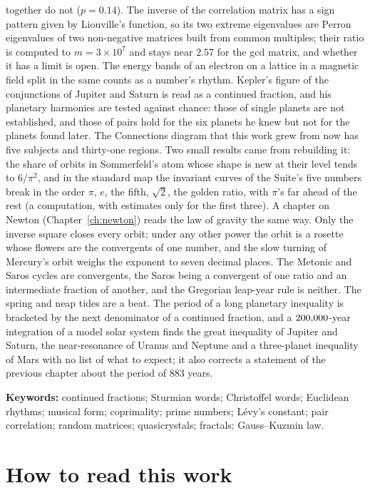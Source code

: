 together do not ($p = 0.14$). The inverse of the correlation matrix has a sign pattern given by Liouville's function, so its two extreme eigenvalues are Perron eigenvalues of two non-negative matrices built from common multiples; their ratio is computed to $m = 3\times10^7$ and stays near $2.57$ for the gcd matrix, and whether it has a limit is open. The energy bands of an electron on a lattice in a magnetic field split in the same counts as a number's rhythm. Kepler's figure of the conjunctions of Jupiter and Saturn is read as a continued fraction, and his planetary harmonies are tested against chance: those of single planets are not established, and those of pairs hold for the six planets he knew but not for the planets found later. \addedon{\revD} The Connections diagram that this work grew from now has five subjects and thirty-one regions. Two small results came from rebuilding it: the share of orbits in Sommerfeld's atom whose shape is new at their level tends to $6/\pi^2$, and in the standard map the invariant curves of the Suite's five numbers break in the order $\pi$, $e$, the fifth, $\sqrt2$, the golden ratio, with $\pi$'s far ahead of the rest (a computation, with estimates only for the first three). \addedon{\revE} A chapter on Newton (Chapter~\ref{ch:newton}) reads the law of gravity the same way. Only the inverse square closes every orbit; under any other power the orbit is a rosette whose flowers are the convergents of one number, and the slow turning of Mercury's orbit weighs the exponent to seven decimal places. The Metonic and Saros cycles are convergents, the Saros being a convergent of one ratio and an intermediate fraction of another, and the Gregorian leap-year rule is neither. The spring and neap tides are a beat. The period of a long planetary inequality is bracketed by the next denominator of a continued fraction, and a $200{,}000$-year integration of a model solar system finds the great inequality of Jupiter and Saturn, the near-resonance of Uranus and Neptune and a three-planet inequality of Mars with no list of what to expect; it also corrects a statement of the previous chapter about the period of $883$ years. \addedon{\revF}

\vspace{1em}
\noindent\textbf{Keywords:} continued fractions; Sturmian words; Christoffel words; Euclidean rhythms; musical form; coprimality; prime numbers; Lévy's constant; pair correlation; random matrices; quasicrystals; fractals; Gauss--Kuzmin law.

\chapter*{How to read this work}

